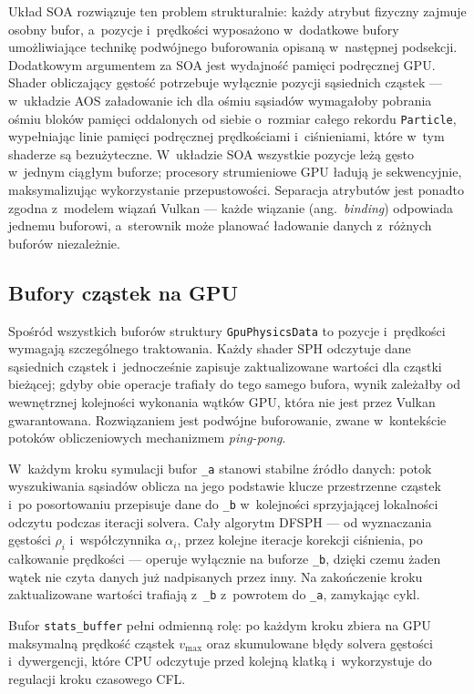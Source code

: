 Układ SOA rozwiązuje ten problem strukturalnie: każdy atrybut fizyczny
zajmuje osobny bufor, a~pozycje i~prędkości wyposażono w~dodatkowe bufory
umożliwiające technikę podwójnego buforowania opisaną w~następnej podsekcji.
Dodatkowym argumentem za SOA jest wydajność pamięci podręcznej GPU.
Shader obliczający gęstość potrzebuje wyłącznie pozycji sąsiednich
cząstek --- w~układzie AOS załadowanie ich dla ośmiu sąsiadów wymagałoby
pobrania ośmiu bloków pamięci oddalonych od siebie o~rozmiar całego
rekordu \texttt{Particle}, wypełniając linie pamięci podręcznej prędkościami
i~ciśnieniami, które w~tym shaderze są bezużyteczne.
W~układzie SOA wszystkie pozycje leżą gęsto w~jednym ciągłym buforze;
procesory strumieniowe GPU ładują je sekwencyjnie, maksymalizując
wykorzystanie przepustowości.
Separacja atrybutów jest ponadto zgodna z~modelem wiązań Vulkan --- każde
wiązanie (ang.~\textit{binding}) odpowiada jednemu buforowi, a~sterownik
może planować ładowanie danych z~różnych buforów niezależnie.

\subsection{Bufory cząstek na GPU}
\label{subsec:gpu_buffers}

Spośród wszystkich buforów struktury \texttt{GpuPhysicsData} to pozycje
i~prędkości wymagają szczególnego traktowania.
Każdy shader SPH odczytuje dane sąsiednich cząstek i~jednocześnie zapisuje
zaktualizowane wartości dla cząstki bieżącej; gdyby obie operacje trafiały
do tego samego bufora, wynik zależałby od wewnętrznej kolejności wykonania
wątków GPU, która nie jest przez Vulkan gwarantowana.
Rozwiązaniem jest podwójne buforowanie,
zwane w~kontekście potoków obliczeniowych mechanizmem \textit{ping-pong}.

W~każdym kroku symulacji bufor \texttt{\_a} stanowi stabilne źródło danych:
potok wyszukiwania sąsiadów oblicza na jego podstawie klucze przestrzenne
cząstek i~po posortowaniu przepisuje dane do \texttt{\_b} w~kolejności
sprzyjającej lokalności odczytu podczas iteracji solvera.
Cały algorytm DFSPH --- od wyznaczania gęstości $\rho_i$ i~współczynnika
$\alpha_i$, przez kolejne iteracje korekcji ciśnienia, po całkowanie
prędkości --- operuje wyłącznie na buforze \texttt{\_b}, dzięki czemu
żaden wątek nie czyta danych już nadpisanych przez inny.
Na zakończenie kroku zaktualizowane wartości trafiają z~\texttt{\_b}
z~powrotem do \texttt{\_a}, zamykając cykl.

Bufor \texttt{stats\_buffer} pełni odmienną rolę: po każdym kroku zbiera
na GPU maksymalną prędkość cząstek $v_{\max}$ oraz skumulowane błędy
solvera gęstości i~dywergencji, które CPU odczytuje przed kolejną klatką
i~wykorzystuje do regulacji kroku czasowego CFL.



